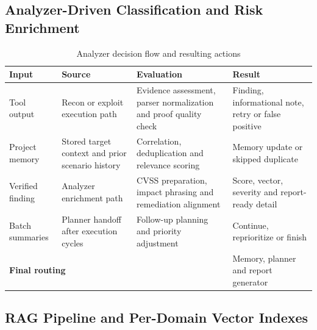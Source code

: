 \documentclass[12pt,a4paper]{report}
\begin{document}
\subsection{Analyzer-Driven Classification and Risk Enrichment}

\begin{table}[H]
    \centering
    \renewcommand{\arraystretch}{1.35}
    \begin{tabular}{|p{}|p{}|p{}|p{}|}
        \hline
        \textbf{Input} & \textbf{Source} & \textbf{Evaluation} & \textbf{Result} \\
        \hline
        Tool output & Recon or exploit execution path & Evidence assessment,
        parser normalization and proof quality check & Finding, informational note,
        retry or false positive \\
        \hline
        Project memory & Stored target context and prior scenario history &
        Correlation, deduplication and relevance scoring & Memory update or skipped
        duplicate \\
        \hline
        Verified finding & Analyzer enrichment path & CVSS preparation, impact
        phrasing and remediation alignment & Score, vector, severity and
        report-ready detail \\
        \hline
        Batch summaries & Planner handoff after execution cycles & Follow-up
        planning and priority adjustment & Continue, reprioritize or finish \\
        \hline
        \multicolumn{3}{|p{0.69\textwidth}|}{\textbf{Final routing}} & Memory,
        planner and report generator \\
        \hline
    \end{tabular}
    \caption{Analyzer decision flow and resulting actions}
    \label{tab:ssvc}
\end{table}

\subsection{RAG Pipeline and Per-Domain Vector Indexes}
\end{document}
